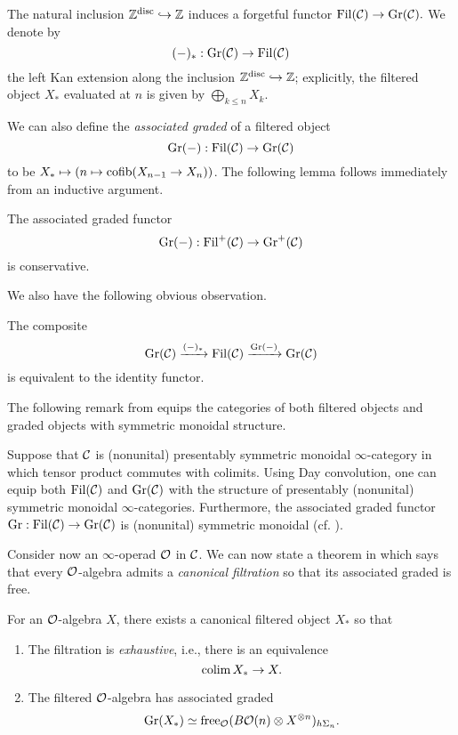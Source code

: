 The natural inclusion $ {\mathbb{Z}}^{\operatorname{disc}}\hookrightarrow {\mathbb{Z}}$ induces a forgetful functor
$
\operatorname{\operatorname{Fil}}({\mathcal{C}}) \to \operatorname{Gr}({\mathcal{C}}). 
$
We denote by
$$
(-)_*: \operatorname{\operatorname{Gr}}({\mathcal{C}}) \to \operatorname{\operatorname{Fil}}({\mathcal{C}})
$$ the left Kan extension along the inclusion $ {\mathbb{Z}}^{\operatorname{disc}}\hookrightarrow {\mathbb{Z}}$; explicitly, the filtered object $X_*$ evaluated at $n$ is given by $\bigoplus_{k\leq n} X_k$.

We can also define the \emph{associated graded} of a filtered object 
$$
\operatorname{\operatorname{Gr}}(-):
\operatorname{\operatorname{Fil}}({\mathcal{C}})
\to 
\operatorname{\operatorname{Gr}}({\mathcal{C}})
$$
to be $X_* \mapsto (n \mapsto \operatorname{cofib}(X_{n-1} \to X_{n}))$.
The following lemma follows immediately from an inductive argument.
\begin{lemma}
\label{Ass-gr is conservative}
	The associated graded functor $$\operatorname{\operatorname{Gr}}(-):
\operatorname{\operatorname{Fil}}^{+}({\mathcal{C}})
\to 
\operatorname{Gr}^{+}({\mathcal{C}})
$$
is conservative.
\end{lemma}

We also have the following obvious observation.
\begin{lemma}
	The composite 
	\[
	\operatorname{\operatorname{Gr}}({\mathcal{C}}) \xrightarrow{(-)_*} 
	\operatorname{\operatorname{Fil}}({\mathcal{C}})
	\xrightarrow{\operatorname{\operatorname{Gr}}(-)} 
	\operatorname{\operatorname{Gr}}({\mathcal{C}}) 
	\]
	is equivalent to the identity functor.
\end{lemma}

The following remark from \cite{Brantner-Mathew} equips the categories of both filtered objects and graded objects with symmetric monoidal structure.
\begin{remark}
\cite[Definition 2.5]{Brantner-Mathew}
Suppose that ${\mathcal{C}}$ is (nonunital) presentably symmetric monoidal $\infty$-category in which tensor product commutes with colimits.
Using Day convolution, one can equip both $\operatorname{\operatorname{Fil}}({\mathcal{C}})$ and $\operatorname{\operatorname{Gr}}({\mathcal{C}})$ with the structure of presentably (nonunital) symmetric monoidal $\infty$-categories. Furthermore, the associated graded functor $\operatorname{\operatorname{Gr}} : \operatorname{\operatorname{Fil}}({\mathcal{C}}) \to \operatorname{\operatorname{Gr}}({\mathcal{C}})$ is (nonunital) symmetric monoidal (cf. \cite[Sec. 2.23]{Glasman}).
\end{remark}

Consider now an $\infty$-operad ${\mathcal{O}}$ in ${\mathcal{C}}$. We can now state a theorem in \cite{Heuts_Koszul} which says that every ${\mathcal{O}}$-algebra admits a \emph{canonical filtration} so that its associated graded is free.
\begin{theorem}
\label{Canonical grading on an O-algebra}
\cite[Theorem 5.2 (2)]{Heuts_Koszul}
For an ${\mathcal{O}}$-algebra $X$, there exists a canonical filtered object $X_{*}$ so that 
\begin{enumerate}
    \item The filtration is \emph{exhaustive}, i.e., there is an equivalence
    $$
    \operatorname{colim} X_{*} \to X.
    $$
    \item The filtered ${\mathcal{O}}$-algebra has associated graded
    $$
    \operatorname{\operatorname{Gr}}(X_*)\simeq \operatorname{free}_{{\mathcal{O}}}(B{\mathcal{O}}(n)\otimes X^{\otimes n })_{h\Sigma_n}.
    $$
\end{enumerate}


\end{theorem}



